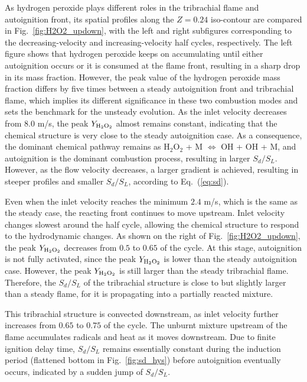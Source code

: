 \documentclass[review,3p,times]{elsarticle}
\begin{document}
As hydrogen peroxide plays different roles in the tribrachial flame and autoignition front, its spatial profiles along the $Z = 0.24$ iso-contour are compared in Fig.~\ref{fig:H2O2_updown}, with the left and right subfigures corresponding to the decreasing-velocity and increasing-velocity half cycles, respectively.  The left figure shows that hydrogen peroxide keeps on accumulating until either autoignition occurs or it is consumed at the flame front, resulting in a sharp drop in its mass fraction.  However, the peak value of the hydrogen peroxide mass fraction differs by five times between a steady autoignition front and tribrachial flame, which implies its different significance in these two combustion modes and sets the benchmark for the unsteady evolution.  As the inlet velocity decreases from $8.0$ m/s, the peak $Y_{\rm H{_2}O{_2}}$ almost remains constant, indicating that the chemical structure is very close to the steady autoignition case.  As a consequence, the dominant chemical pathway remains as H$_2$O$_2$ + M $\Longleftrightarrow$ OH + OH + M, and autoignition is the dominant combustion process, resulting in larger $S_d/S_L$.  However, as the flow velocity decreases, a larger gradient is achieved, resulting in steeper profiles and smaller $S_d/S_L$, according to Eq.~(\ref{eq:sd}).       

Even when the inlet velocity reaches the minimum $2.4$ m/s, which is the same as the steady case, the reacting front continues to move upstream.  Inlet velocity changes slowest around the half cycle, allowing the chemical structure to respond to the hydrodynamic changes.  As shown on the right of Fig.~\ref{fig:H2O2_updown}, the peak $Y_{\rm H{_2}O{_2}}$ decreases from $0.5$ to $0.65$ of the cycle.  At this stage, autoignition is not fully activated, since the peak $Y_{\rm H{_2}O{_2}}$ is lower than the steady autoignition case.  However, the peak $Y_{\rm H{_2}O{_2}}$ is still larger than the steady tribrachial flame.  Therefore, the $S_d/S_L$ of the tribrachial structure is close to but slightly larger than a steady flame, for it is propagating into a partially reacted mixture.  

This tribrachial structure is convected downstream, as inlet velocity further increases from $0.65$ to $0.75$ of the cycle.  The unburnt mixture upstream of the flame accumulates radicals and heat as it moves downstream.  \textcolor{CNF}{Due to finite ignition delay time, $S_d/S_L$ remains essentially constant during the induction period (flattened bottom in Fig.~\ref{fig:sd_hys}) before autoignition eventually occurs, indicated by a sudden jump of $S_d/S_L$.}
\end{document}
